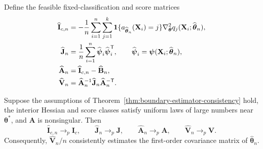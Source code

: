 Define the feasible fixed-classification and score matrices
\begin{align}
 \widehat{\mathbf{I}}_{c,n}
 &=-\frac1n\sum_{i=1}^n\sum_{j=1}^k
 \mathbf 1\{a_{\widehat{\boldsymbol{\theta}}_n}(\mathbf{X}_i)=j\}
 \nabla_{\boldsymbol{\theta}}^2q_j(\mathbf{X}_i;\widehat{\boldsymbol{\theta}}_n),                         \label{eq:ic-estimator}\\
 \widehat{\mathbf{J}}_n
 &=\frac1n\sum_{i=1}^n
 \widehat{\boldsymbol{\psi}}_i\widehat{\boldsymbol{\psi}}_i^\mathsf T,
 \qquad
 \widehat{\boldsymbol{\psi}}_i=\boldsymbol{\psi}(\mathbf{X}_i;\widehat{\boldsymbol{\theta}}_n),              \label{eq:j-estimator}\\
 \widehat{\mathbf{A}}_n
 &=\widehat{\mathbf{I}}_{c,n}-\widehat{\mathbf{B}}_n,               \label{eq:a-estimator}\\
 \widehat{\mathbf{V}}_n
 &=\widehat{\mathbf{A}}_n^{-1}\widehat{\mathbf{J}}_n\widehat{\mathbf{A}}_n^{-\mathsf T}.
 \label{eq:v-estimator}
\end{align}

\begin{theorem}
\label{thm:sandwich-consistency}
Suppose the assumptions of
Theorem~\ref{thm:boundary-estimator-consistency} hold, the interior Hessian and
score classes satisfy uniform laws of large numbers near $\boldsymbol{\theta}^*$, and $\mathbf{A}$
is nonsingular.  Then
\begin{equation}
 \widehat{\mathbf{I}}_{c,n}\to_p \mathbf{I}_c,\qquad
 \widehat{\mathbf{J}}_n\to_p \mathbf{J},\qquad
 \widehat{\mathbf{A}}_n\to_p \mathbf{A},\qquad
 \widehat{\mathbf{V}}_n\to_p \mathbf{V}.
 \label{eq:sandwich-consistency}
\end{equation}
Consequently, $\widehat{\mathbf{V}}_n/n$ consistently estimates the first-order
covariance matrix of $\widehat{\boldsymbol{\theta}}_n$.
\end{theorem}

